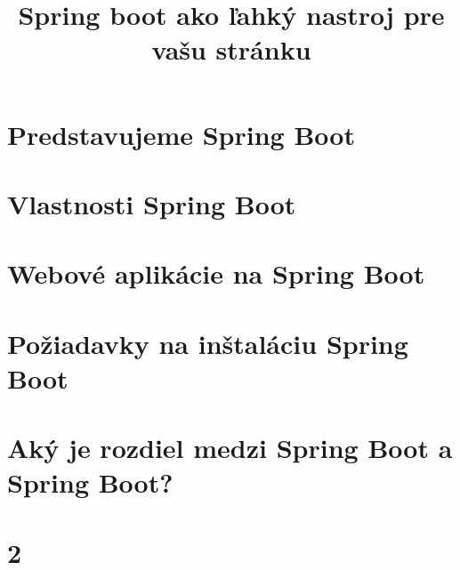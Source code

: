 \documentclass[12pt, letterpaper]{article}
\begin{document}
\title{Spring boot ako ľahký nastroj pre vašu stránku}
\maketitle

\section{Predstavujeme Spring Boot}

\section{Vlastnosti Spring Boot}

\section{Webové aplikácie na Spring Boot}

\section{Požiadavky na inštaláciu Spring Boot}

\section{Aký je rozdiel medzi Spring Boot a Spring Boot?}

\section{2}
\end{document}
